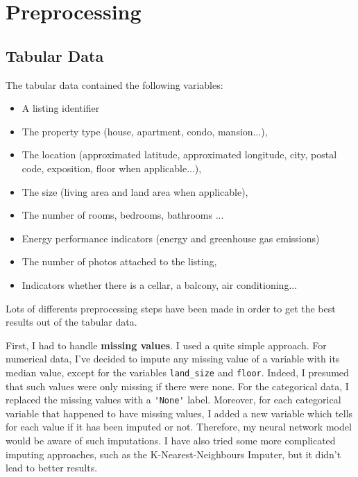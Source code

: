 \documentclass[11pt, a4paper, twocolumn]{article}
\begin{document}
\section{Preprocessing}
\subsection{Tabular Data}
The tabular data contained the following variables:
\vspace{-4mm}
\begin{itemize}
\item A listing identifier
\vspace{-2mm}
\item The property type (house, apartment, condo, mansion...),
\vspace{-2mm}
\item The location (approximated latitude, approximated longitude, city, postal code, exposition, floor when applicable...),
\vspace{-2mm}
\item The size (living area and land area when applicable),
\vspace{-2mm}
\item The number of rooms, bedrooms, bathrooms ...
\vspace{-2mm}
\item Energy performance indicators (energy and greenhouse gas emissions)
\vspace{-2mm}
\item The number of photos attached to the listing,
\vspace{-2mm}
\item Indicators whether there is a cellar, a balcony, air conditioning...
\end{itemize}
Lots of differents preprocessing steps have been made in order to get the best results out of the tabular data.

 

First, I had to handle \textbf{missing values}. I used a quite simple approach. For numerical data, I've decided to impute any missing value of a variable with its median value, except for the variables \verb+land_size+ and \verb+floor+. Indeed, I presumed that such values were only missing if there were none. For the categorical data, I replaced the missing values with a \verb+'None'+ label. Moreover, for each categorical variable that happened to have missing values, I added a new variable which tells for each value if it has been imputed or not. Therefore, my neural network model would be aware of such imputations. I have also tried some more complicated imputing approaches, such as the K-Nearest-Neighbours Imputer, but it didn't lead to better results. 
\end{document}

